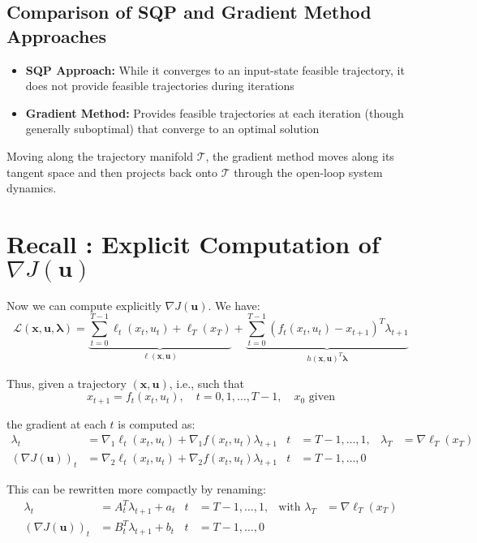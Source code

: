 \documentclass[openany]{book}
\theoremstyle{definition}
\theoremstyle{remark}
\begin{document}
\subsection{Comparison of SQP and Gradient Method Approaches}
\begin{itemize}
    \item \textbf{SQP Approach:} While it converges to an input-state feasible trajectory, it does not provide feasible trajectories during iterations
    \item \textbf{Gradient Method:} Provides feasible trajectories at each iteration (though generally suboptimal) that converge to an optimal solution
\end{itemize}

Moving along the trajectory manifold $\mathcal{T}$, the gradient method moves along its tangent space and then projects back onto $\mathcal{T}$ through the open-loop system dynamics.

\section{Recall : Explicit Computation of \texorpdfstring{$\nabla J(\mathbf{u})$}{Gradient}}

Now we can compute explicitly $\nabla J(\mathbf{u})$. We have:
\begin{equation}
    \mathcal{L}(\mathbf{x}, \mathbf{u}, \boldsymbol{\lambda}) = \underbrace{\sum_{t=0}^{T-1}\ell_t(x_t, u_t) + \ell_T(x_T)}_{\ell(\mathbf{x},\mathbf{u})} + \underbrace{\sum_{t=0}^{T-1}(f_t(x_t, u_t) - x_{t+1})^T\lambda_{t+1}}_{h(\mathbf{x},\mathbf{u})^T\boldsymbol{\lambda}}
\end{equation}

Thus, given a trajectory $(\mathbf{x}, \mathbf{u})$, i.e., such that
\[
    x_{t+1} = f_t(x_t, u_t), \quad t = 0,1,\ldots,T-1, \quad x_0 \text{ given}
\]

the gradient at each $t$ is computed as:
\begin{align*}
    \lambda_t &= \nabla_1\ell_t(x_t, u_t) + \nabla_1f(x_t, u_t)\lambda_{t+1} & t &= T-1,\ldots,1, & \lambda_T &= \nabla\ell_T(x_T)\\
    (\nabla J(\mathbf{u}))_t &= \nabla_2\ell_t(x_t, u_t) + \nabla_2f(x_t, u_t)\lambda_{t+1} & t &= T-1,\ldots,0
\end{align*}

This can be rewritten more compactly by renaming:
\begin{align*}
    \lambda_t &= A_t^T\lambda_{t+1} + a_t & t &= T-1,\ldots,1, & \text{with }\lambda_T &= \nabla\ell_T(x_T)\\
    (\nabla J(\mathbf{u}))_t &= B_t^T\lambda_{t+1} + b_t & t &= T-1,\ldots,0
\end{align*}
\end{document}
